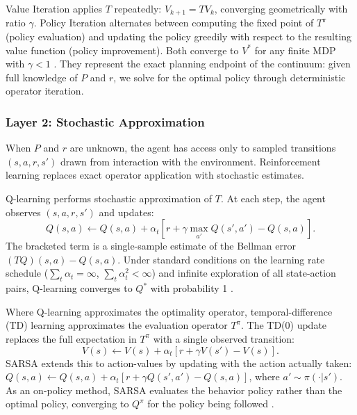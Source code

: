 Value Iteration applies $T$ repeatedly: $V_{k+1} = TV_k$, converging geometrically with ratio $\gamma$. Policy Iteration alternates between computing the fixed point of $T^\pi$ (policy evaluation) and updating the policy greedily with respect to the resulting value function (policy improvement). Both converge to $V^*$ for any finite MDP with $\gamma < 1$ \citep{sutton2018}. They represent the exact planning endpoint of the continuum: given full knowledge of $P$ and $r$, we solve for the optimal policy through deterministic operator iteration.

\subsubsection{Layer 2: Stochastic Approximation}

When $P$ and $r$ are unknown, the agent has access only to sampled transitions $(s, a, r, s')$ drawn from interaction with the environment. Reinforcement learning replaces exact operator application with stochastic estimates.

Q-learning \citep{watkins1992_paper} performs stochastic approximation of $T$. At each step, the agent observes $(s, a, r, s')$ and updates:
\begin{equation}
Q(s,a) \leftarrow Q(s,a) + \alpha_t \left[ r + \gamma \max_{a'} Q(s',a') - Q(s,a) \right].
\label{eq:q_learning}
\end{equation}
The bracketed term is a single-sample estimate of the Bellman error $(TQ)(s,a) - Q(s,a)$. Under standard conditions on the learning rate schedule ($\sum_t \alpha_t = \infty$, $\sum_t \alpha_t^2 < \infty$) and infinite exploration of all state-action pairs, Q-learning converges to $Q^*$ with probability 1 \citep{watkins1992_paper}.

Where Q-learning approximates the optimality operator, temporal-difference (TD) learning \citep{sutton1988} approximates the evaluation operator $T^\pi$. The TD(0) update replaces the full expectation in $T^\pi$ with a single observed transition:
\begin{equation}
V(s) \leftarrow V(s) + \alpha_t \left[ r + \gamma V(s') - V(s) \right].
\end{equation}
SARSA extends this to action-values by updating with the action actually taken: $Q(s,a) \leftarrow Q(s,a) + \alpha_t [r + \gamma Q(s',a') - Q(s,a)]$, where $a' \sim \pi(\cdot|s')$. As an on-policy method, SARSA evaluates the behavior policy rather than the optimal policy, converging to $Q^\pi$ for the policy being followed \citep{singh2000}.

